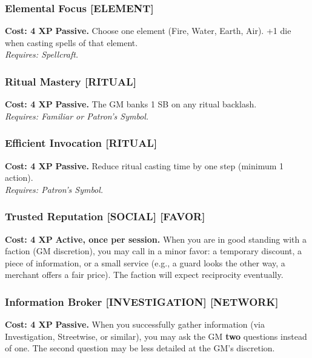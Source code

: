 \subsubsection*{Elemental Focus \textnormal{[ELEMENT]}}
\label{talent:elemental-focus}
\textbf{Cost: 4 XP} \textbf{Passive.} Choose one element (Fire, Water, Earth, Air). +1 die when casting spells of that element. \\
\textit{Requires: Spellcraft.}

\subsubsection*{Ritual Mastery \textnormal{[RITUAL]}}
\label{talent:ritual-mastery}
\textbf{Cost: 4 XP} \textbf{Passive.} The GM banks 1 SB on any ritual backlash. \\
\textit{Requires: Familiar or Patron's Symbol.}

\subsubsection*{Efficient Invocation \textnormal{[RITUAL]}}
\label{talent:efficient-invocation}
\textbf{Cost: 4 XP} \textbf{Passive.} Reduce ritual casting time by one step (minimum 1 action). \\
\textit{Requires: Patron's Symbol.}

\subsubsection*{Trusted Reputation \textnormal{[SOCIAL] [FAVOR]}}
\label{talent:trusted-reputation}
\textbf{Cost: 4 XP} \textbf{Active, once per session.} When you are in good standing with a faction (GM discretion), you may call in a minor favor: a temporary discount, a piece of information, or a small service (e.g., a guard looks the other way, a merchant offers a fair price). The faction will expect reciprocity eventually.

\subsubsection*{Information Broker \textnormal{[INVESTIGATION] [NETWORK]}}
\label{talent:information-broker}
\textbf{Cost: 4 XP} \textbf{Passive.} When you successfully gather information (via Investigation, Streetwise, or similar), you may ask the GM \textbf{two} questions instead of one. The second question may be less detailed at the GM's discretion.

